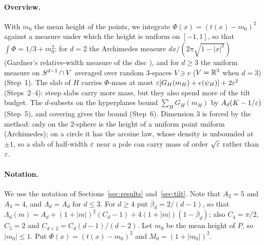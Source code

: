 \documentclass[11pt]{article}
\newcommand{\Abb}{\bar\beta}
\begin{document}
\paragraph{Overview.} With $m_0$ the mean height of the points, we integrate $\Phi(x)=(t(x)-m_0)^2$
against a measure under which the height is uniform on $[-1,1]$, so that $\int\Phi=1/3+m_0^2$: for $d=2$ the
Archimedes measure $dx/(2\pi\sqrt{1-|x|^2})$ (Gardner's relative-width measure of the disc
\cite{Gardner}), and for $d\ge3$ the uniform measure on $S^{d-1}\cap V$ averaged over random
$3$-spaces $V\ni v$ ($V=\mathbb{R}^3$ when $d=3$) (Step~1). The slab of $H$ carries $\Phi$-mass at most
$\varepsilon[G_H(m_H)+e(\psi_H)]+2\varepsilon^2$ (Steps~2--4): steep slabs carry more mass, but they also spend more
of the tilt budget. The $d$-subsets on the hyperplanes bound $\sum_HG_H(m_H)$ by $A_d(K-1/\varepsilon)$ (Step~5),
and covering gives the bound (Step~6). Dimension $3$ is forced by the method: only on the
$2$-sphere is the height of a uniform point uniform (Archimedes); on a circle it has the arcsine law,
whose density is unbounded at $\pm1$, so a slab of half-width $\varepsilon$ near a pole can carry mass of order
$\sqrt{\varepsilon}$ rather than $\varepsilon$.

\paragraph{Notation.} We use the notation of Sections~\ref{sec:results} and~\ref{sec:tilt}. Note that
$A_2 = 5$ and $A_3 = 4$, and $\Lambda_d = A_d$ for $d \le 3$. For $d \ge 4$ put $\Abb_d = 2/(d-1)$, so that
$\Lambda_d(m) = A_d + (1+|m|)^2(C_d - 1) + 4(1+|m|)(1 - \Abb_d)$; also $C_4 = \pi/2$, $C_5 = 2$ and
$C_{d+2} = C_d (d-1)/(d-2)$.
Let $m_0$ be the mean height of $P$, so $|m_0| \le 1$.
Put $\Phi(x) = (t(x) - m_0)^2$ and $M_0 = (1 + |m_0|)^2$.
\end{document}
